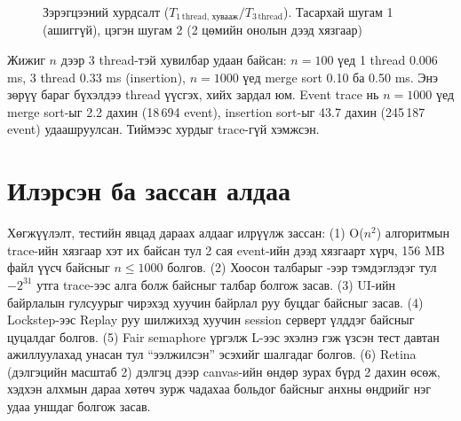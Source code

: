 \begin{figure}[H]
\centering
{}
\caption{Зэрэгцээний хурдсалт ($T_{1\,\text{thread, хувааж}} / T_{3\,\text{thread}}$). Тасархай шугам 1 (ашиггүй), цэгэн шугам 2 (2 цөмийн онолын дээд хязгаар)}
\label{fig:bench-speedup}
\end{figure}

Жижиг $n$ дээр 3 thread-тэй хувилбар удаан байсан: $n = 100$ үед 1 thread 0.006 ms, 3 thread 0.33 ms (insertion),
$n = 1000$ үед merge sort 0.10 ба 0.50 ms. Энэ зөрүү бараг бүхэлдээ thread үүсгэх,  хийх зардал юм.
Event trace нь $n = 1000$ үед merge sort-ыг 2.2 дахин (18\,694 event), insertion sort-ыг 43.7 дахин (245\,187 event)
удаашруулсан. Тиймээс хурдыг trace-гүй хэмжсэн.

\section{Илэрсэн ба зассан алдаа}\label{sec:bugs}
Хөгжүүлэлт, тестийн явцад дараах алдааг илрүүлж зассан:
(1) O($n^2$) алгоритмын trace-ийн хязгаар хэт их байсан тул 2 сая event-ийн дээд хязгаарт хүрч, 156 MB файл үүсч байсныг
$n \le 1000$ болгов. (2) Хоосон талбарыг -ээр тэмдэглэдэг тул $-2^{31}$ утга trace-ээс алга болж
байсныг  талбар болгож засав. (3) UI-ийн байрлалын гулсуурыг чирэхэд хуучин байрлал руу буцдаг байсныг засав.
(4) Lockstep-ээс Replay руу шилжихэд хуучин session серверт үлддэг байсныг цуцалдаг болгов. (5) Fair semaphore үргэлж L-ээс
эхэлнэ гэж үзсэн тест давтан ажиллуулахад унасан тул “ээлжилсэн” эсэхийг шалгадаг болгов. (6) Retina (дэлгэцийн
масштаб 2) дэлгэц дээр canvas-ийн өндөр зурах бүрд 2 дахин өсөж, хэдхэн алхмын дараа хөтөч зурж чадахаа больдог
байсныг анхны өндрийг нэг удаа уншдаг болгож засав.
